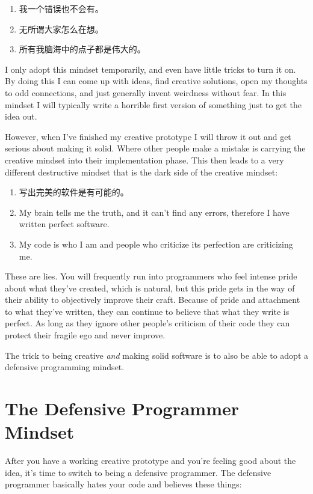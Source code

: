 \begin{enumerate}
\item 我一个错误也不会有。
\item 无所谓大家怎么在想。
\item 所有我脑海中的点子都是伟大的。
\end{enumerate}

I only adopt this mindset temporarily, and even have little tricks to turn it on.
By doing this I can come up with ideas, find creative solutions, open my thoughts
to odd connections, and just generally invent weirdness without fear.  In this
mindset I will typically write a horrible first version of something just to get
the idea out.

However, when I've finished my creative prototype I will throw it out and 
get serious about making it solid.  Where other people make a mistake is
carrying the creative mindset into their implementation phase.  This
then leads to a very different destructive mindset that is the dark side
of the creative mindset:

\begin{enumerate}
\item 写出完美的软件是有可能的。
\item My brain tells me the truth, and it can't find any errors, therefore I have written perfect software.
\item My code is who I am and people who criticize its perfection are criticizing me.
\end{enumerate}

These are lies.  You will frequently run into programmers who feel intense
pride about what they've created, which is natural, but this pride gets in the
way of their ability to objectively improve their craft.  Because of pride and
attachment to what they've written, they can continue to believe that what they
write is perfect.  As long as they ignore other people's criticism of their
code they can protect their fragile ego and never improve.

The trick to being creative \emph{and} making solid software is to 
also be able to adopt a defensive programming mindset.


\section{The Defensive Programmer Mindset}

After you have a working creative prototype and you're feeling good about the
idea, it's time to switch to being a defensive programmer.  The defensive
programmer basically hates your code and believes these things:

